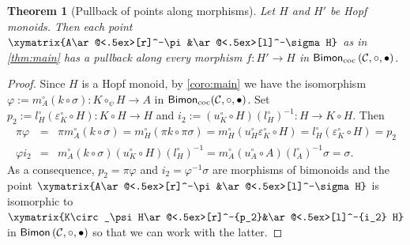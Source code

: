 \documentclass[nosumlimits,twoside]{amsart}
\newtheorem{theorem}{\sc Theorem}[section]
\theoremstyle{definition}
\theoremstyle{remark}
\newenvironment{invisible}{{\noindent\sc \colorbox{yellow}{Invisible:}\;}\color{gray}}{\medskip}
\newcommand{\rd}[1]{{\color{red}{#1}}}
\newcommand{\Cc}{\mathcal{C}}
\def\Bimon{{\sf Bimon}}
\def\cBimon{{\sf Bimon}_{\mathrm{coc}}}
\begin{document}

\begin{theorem}[Pullback of points along morphisms]
\label{thm:ddlstab}
Let $H$ and $H'$ be Hopf monoids. Then each point $\xymatrix{A\ar@<.5ex>[r]^-\pi&\ar@<.5ex>[l]^-\sigma H}$  as in \cref{thm:main}
has a pullback  along every morphism $f:H'\to H$ in $\cBimon \left(\Cc,\circ,\bullet\right) $.
\end{theorem}

\begin{proof} Since $H$ is a Hopf monoid, by \cref{coro:main} we have the isomorphism $\varphi:=m_A^\circ(k\circ \sigma):K\circ_\psi H\to A$ in $\cBimon(\Cc,\circ,\bullet)$.
    Set $p_{2}:=l_{H}^{\circ }\left( \varepsilon _{K}^{\circ }\circ H\right)
:K\circ H\rightarrow H$ and $i_{2}:=\left( u_{K}^{\circ }\circ H\right)
\left( l_{H}^{\circ }\right) ^{-1}:H\to K\circ H$. Then
\begin{eqnarray*}
\pi \varphi  &=&\pi m_{A}^{\circ }\left( k\circ \sigma \right) =m_{H}^{\circ
}\left( \pi k\circ \pi \sigma \right) =m_{H}^{\circ }\left( u_{H}^{\circ
}\varepsilon _{K}^{\circ }\circ H\right) =l_{H}^{\circ }\left( \varepsilon
_{K}^{\circ }\circ H\right) =p_{2} \\
\varphi i_{2} &=&m_{A}^{\circ }\left( k\circ \sigma \right) \left(
u_{K}^{\circ }\circ H\right) \left( l_{H}^{\circ }\right) ^{-1}=m_{A}^{\circ
}\left( u_{A}^{\circ }\circ A\right) \left( l_{A}^{\circ }\right)
^{-1}\sigma =\sigma .
\end{eqnarray*}%
As a consequence, $p_2=\pi\varphi$ and $i_2=\varphi^{-1}\sigma$ are morphisms of bimonoids and the point $\xymatrix{A\ar@<.5ex>[r]^-\pi&\ar@<.5ex>[l]^-\sigma H}$ is isomorphic to $\xymatrix{K\circ_\psi H\ar@<.5ex>[r]^-{p_2}&\ar@<.5ex>[l]^-{i_2} H}$ in $\Bimon \left(\Cc,\circ,\bullet\right) $ so that we can work with the latter.


\end{proof}
\end{document}
